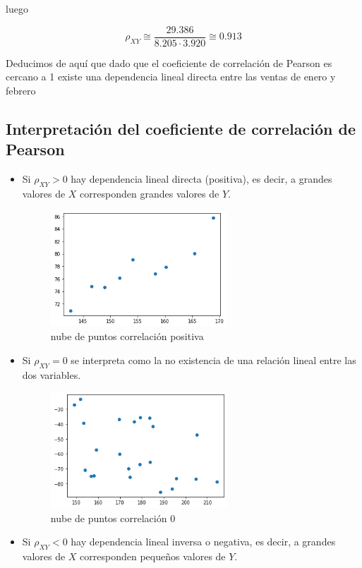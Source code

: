 \documentclass[]{book}
\theoremstyle{plain}
\theoremstyle{definition}
\begin{document}
luego

\[\rho_{XY}\cong\frac{29.386}{8.205 \cdot 3.920} \cong 0.913\]

Deducimos de aquí que dado que el coeficiente de correlación de Pearson
es cercano a 1 existe una dependencia lineal directa entre las ventas de
enero y febrero

\hypertarget{interpretaciuxf3n-del-coeficiente-de-correlaciuxf3n-de-pearson}{%
\subsection{Interpretación del coeficiente de correlación de
Pearson}\label{interpretaciuxf3n-del-coeficiente-de-correlaciuxf3n-de-pearson}}

\begin{itemize}
\item
  Si \(\rho_{XY}>{0}\) hay dependencia lineal directa (positiva), es
  decir, a grandes valores de \(X\) corresponden grandes valores de
  \(Y\).

  \begin{figure}
  \centering
  \includegraphics[width=2.60417in,height=\textheight]{img/cloud.png}
  \caption{nube de puntos correlación positiva}
  \end{figure}
\item
  Si \(\rho_{XY} ={0}\) se interpreta como la no existencia de una
  relación lineal entre las dos variables.

  \begin{figure}
  \centering
  \includegraphics[width=2.60417in,height=\textheight]{img/cloud_cero.png}
  \caption{nube de puntos correlación 0}
  \end{figure}
\item
  Si \(\rho_{XY}<{0}\) hay dependencia lineal inversa o negativa, es
  decir, a grandes valores de \(X\) corresponden pequeños valores de
  \(Y\).


\end{itemize}
\end{document}

